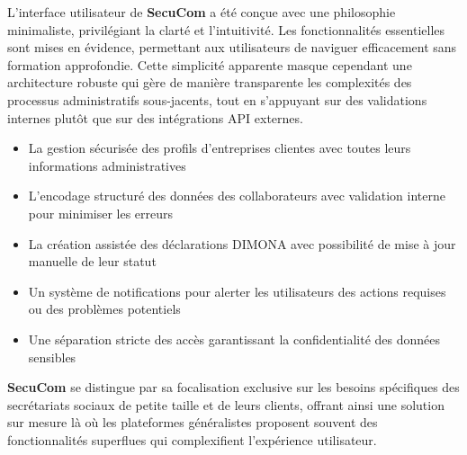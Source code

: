 \begin{note}
L'interface utilisateur de \textbf{SecuCom} a été conçue avec une philosophie minimaliste, privilégiant la clarté et l'intuitivité. Les fonctionnalités essentielles sont mises en évidence, permettant aux utilisateurs de naviguer efficacement sans formation approfondie. Cette simplicité apparente masque cependant une architecture robuste qui gère de manière transparente les complexités des processus administratifs sous-jacents, tout en s'appuyant sur des validations internes plutôt que sur des intégrations API externes.
\end{note}

\begin{tcolorbox}[
  title={\textbf{Fonctionnalités clés de SecuCom}},
  colback=blue!5!white,
  colframe=primarycolor,
  fonttitle=\bfseries,
  boxrule=0.5mm,
  arc=2mm,
  left=6mm,
  right=6mm,
  top=6mm,
  bottom=6mm
]
\begin{itemize}[leftmargin=*,label=\textcolor{darkgray}{$\bullet$},itemsep=0.3em]
  \item La gestion sécurisée des profils d'entreprises clientes avec toutes leurs informations administratives
  \item L'encodage structuré des données des collaborateurs avec validation interne pour minimiser les erreurs
  \item La création assistée des déclarations DIMONA avec possibilité de mise à jour manuelle de leur statut
  \item Un système de notifications pour alerter les utilisateurs des actions requises ou des problèmes potentiels
  \item Une séparation stricte des accès garantissant la confidentialité des données sensibles
\end{itemize}
\end{tcolorbox}

\vspace{0.5cm}

\noindent \textbf{SecuCom} se distingue par sa focalisation exclusive sur les besoins spécifiques des secrétariats sociaux de petite taille et de leurs clients, offrant ainsi une solution sur mesure là où les plateformes généralistes proposent souvent des fonctionnalités superflues qui complexifient l'expérience utilisateur.

\vspace{0.5cm}

